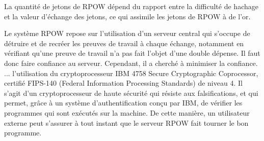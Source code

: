 La quantité de jetons de RPOW dépend du rapport entre la difficulté de hachage et la valeur d'échange des jetons, ce qui assimile les jetons de RPOW à de l'or.

Le système RPOW repose sur l'utilisation d'un serveur central qui s'occupe de détruire et de recréer les preuves de travail à chaque échange, notamment en vérifiant qu'une preuve de travail n'a pas fait l'objet d'une double dépense. Il faut donc faire confiance au serveur. Cependant, il a cherché à minimiser la confiance. ... l'utilisation du cryptoprocesseur IBM 4758 Secure Cryptographic Coprocessor, certifié FIPS-140 (Federal Information Processing Standards) de niveau 4. Il s'agit d'un cryptoprocesseur de haute sécurité qui résiste aux falsifications, et qui permet, grâce à un système d'authentification conçu par IBM, de vérifier les programmes qui sont exécutés sur la machine. De cette manière, un utilisateur externe peut s'assurer à tout instant que le serveur RPOW fait tourner le bon programme. %

